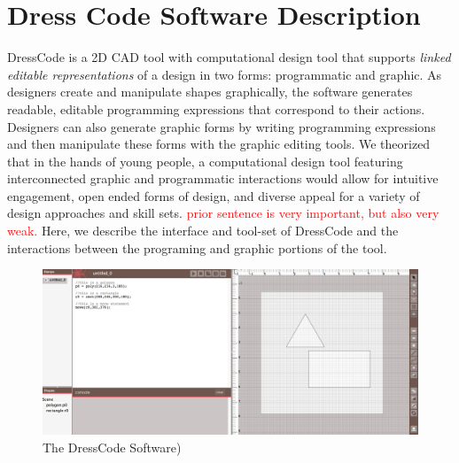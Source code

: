 \documentclass{sigchi}
\begin{document}
\section{Dress Code Software Description}
DressCode is a 2D CAD tool with computational design tool that supports \emph{linked editable representations} of a design in two forms: programmatic and graphic. As designers create and manipulate shapes graphically, the software generates readable, editable programming expressions that correspond to their actions. Designers can also generate graphic forms by writing programming expressions and then manipulate these forms with the graphic editing tools. We theorized that in the hands of young people, a computational design tool featuring interconnected graphic and programmatic interactions would allow for intuitive engagement, open ended forms of design, and diverse appeal for a variety of design approaches and skill sets. \textcolor{red}{prior sentence is very important, but also very weak.} Here, we describe the interface and tool-set of DressCode and the interactions between the programing and graphic portions of the tool.

\begin{figure}
\includegraphics[width=\textwidth]{images/application_image_sm_content.jpg}
\caption{The DressCode Software)}
\label{fig:application_image}
\end{figure}
\end{document}
